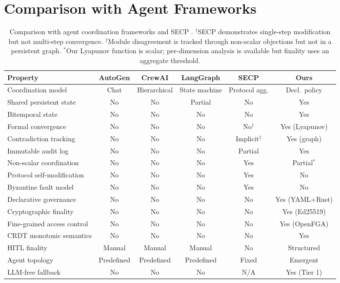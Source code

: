 \documentclass[11pt]{article}
\begin{document}
\section{Comparison with Agent Frameworks}

\begin{table}[H]
\centering
\small
\begin{tabular}{lccccc}
\toprule
\textbf{Property} & \textbf{AutoGen} & \textbf{CrewAI} & \textbf{LangGraph} & \textbf{SECP} & \textbf{Ours} \\
\midrule
Coordination model & Chat & Hierarchical & State machine & Protocol agg. & Decl.\ policy \\
Shared persistent state & No & No & Partial & No & Yes \\
Bitemporal state & No & No & No & No & Yes \\
Formal convergence & No & No & No & No$^{\dagger}$ & Yes (Lyapunov) \\
Contradiction tracking & No & No & No & Implicit$^{\ddagger}$ & Yes (graph) \\
Immutable audit log & No & No & No & Partial & Yes \\
Non-scalar coordination & No & No & No & Yes & Partial$^{*}$ \\
Protocol self-modification & No & No & No & Yes & No \\
Byzantine fault model & No & No & No & Yes & No \\
Declarative governance & No & No & No & No & Yes (YAML+Rust) \\
Cryptographic finality & No & No & No & No & Yes (Ed25519) \\
Fine-grained access control & No & No & No & No & Yes (OpenFGA) \\
CRDT monotonic semantics & No & No & No & No & Yes \\
HITL finality & Manual & Manual & Manual & No & Structured \\
Agent topology & Predefined & Predefined & Predefined & Fixed & Emergent \\
LLM-free fallback & No & No & No & N/A & Yes (Tier 1) \\
\bottomrule
\end{tabular}
\caption{Comparison with agent coordination frameworks and SECP \cite{delachica2026}. $^{\dagger}$SECP demonstrates single-step modification but not multi-step convergence. $^{\ddagger}$Module disagreement is tracked through non-scalar objections but not in a persistent graph. $^{*}$Our Lyapunov function is scalar; per-dimension analysis is available but finality uses an aggregate threshold.}
\label{tab:comparison}
\end{table}
\end{document}
